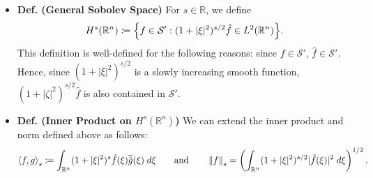\documentclass{article}
\begin{document}
\begin{itemize}
	\item \textbf{Def. (General Sobolev Space)} For $s \in \mathbb{R}$, we define 
		\begin{equation}
			H^{s}(\mathbb{R}^{n}) \coloneqq \brac*{f \in \mathcal{S}': (1 + |\xi|^{2})^{s/2}\hat{f} \in L^{2}(\mathbb{R}^{n})}. 
		\end{equation}
	This definition is well-defined for the following reasons: since $f \in \mathcal{S}'$, $\hat{f} \in \mathcal{S}'$. Hence, since $(1 + |\xi|^{2})^{s/2}$ is a slowly increasing smooth function, $(1 + |\zeta|^{2})^{s/2}\hat{f}$ is also contained in $\mathcal{S}'$. 
	
	\item \textbf{Def. (Inner Product on $H^{s}(\mathbb{R}^{n})$)} We can extend the inner product and norm defined above as follows: 
		\begin{equation}
			\braket{f,g}_{s} \coloneqq \int_{\mathbb{R}^{n}}(1 + |\xi|^{2})^{s}\hat{f}(\xi)\overline{\hat{g}}(\xi)\;d\xi \qquad \text{and} \qquad \left\Vert f \right\Vert_{s} = \left(\int_{\mathbb{R}^{n}}(1 + |\xi|^{2})^{s/2}|\hat{f}(\xi)|^{2}\;d\xi\right)^{1/2}.
		\end{equation}
	

\end{itemize}
\end{document}
